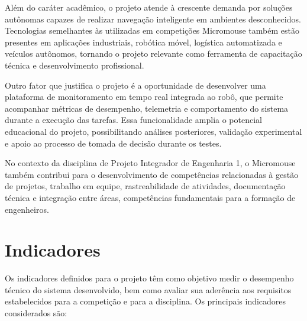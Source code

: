 Além do caráter acadêmico, o projeto atende à crescente demanda por soluções autônomas capazes de realizar navegação inteligente em ambientes desconhecidos. Tecnologias semelhantes às utilizadas em competições Micromouse também estão presentes em aplicações industriais, robótica móvel, logística automatizada e veículos autônomos, tornando o projeto relevante como ferramenta de capacitação técnica e desenvolvimento profissional.

Outro fator que justifica o projeto é a oportunidade de desenvolver uma plataforma de monitoramento em tempo real integrada ao robô, que permite acompanhar métricas de desempenho, telemetria e comportamento do sistema durante a execução das tarefas. Essa funcionalidade amplia o potencial educacional do projeto, possibilitando análises posteriores, validação experimental e apoio ao processo de tomada de decisão durante os testes.

No contexto da disciplina de Projeto Integrador de Engenharia 1, o Micromouse também contribui para o desenvolvimento de competências relacionadas à gestão de projetos, trabalho em equipe, rastreabilidade de atividades, documentação técnica e integração entre áreas, competências fundamentais para a formação de engenheiros.

\section{Indicadores}

Os indicadores definidos para o projeto têm como objetivo medir o desempenho técnico do sistema desenvolvido, bem como avaliar sua aderência aos requisitos estabelecidos para a competição e para a disciplina. Os principais indicadores considerados são:

